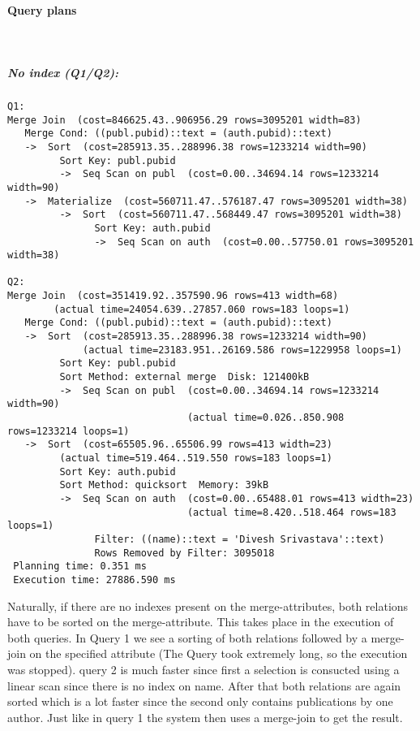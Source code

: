 \documentclass[11pt]{scrartcl}
\begin{document}
\paragraph{Query plans}\mbox{}\\
\subparagraph{No index (Q1/Q2):}
{\small
\begin{verbatim}
Q1:
Merge Join  (cost=846625.43..906956.29 rows=3095201 width=83)
   Merge Cond: ((publ.pubid)::text = (auth.pubid)::text)
   ->  Sort  (cost=285913.35..288996.38 rows=1233214 width=90)
         Sort Key: publ.pubid
         ->  Seq Scan on publ  (cost=0.00..34694.14 rows=1233214 width=90)
   ->  Materialize  (cost=560711.47..576187.47 rows=3095201 width=38)
         ->  Sort  (cost=560711.47..568449.47 rows=3095201 width=38)
               Sort Key: auth.pubid
               ->  Seq Scan on auth  (cost=0.00..57750.01 rows=3095201 width=38)

Q2:
Merge Join  (cost=351419.92..357590.96 rows=413 width=68)
	    (actual time=24054.639..27857.060 rows=183 loops=1)
   Merge Cond: ((publ.pubid)::text = (auth.pubid)::text)
   ->  Sort  (cost=285913.35..288996.38 rows=1233214 width=90)
             (actual time=23183.951..26169.586 rows=1229958 loops=1)
         Sort Key: publ.pubid
         Sort Method: external merge  Disk: 121400kB
         ->  Seq Scan on publ  (cost=0.00..34694.14 rows=1233214 width=90)
                               (actual time=0.026..850.908 rows=1233214 loops=1)
   ->  Sort  (cost=65505.96..65506.99 rows=413 width=23)
	     (actual time=519.464..519.550 rows=183 loops=1)
         Sort Key: auth.pubid
         Sort Method: quicksort  Memory: 39kB
         ->  Seq Scan on auth  (cost=0.00..65488.01 rows=413 width=23)
                               (actual time=8.420..518.464 rows=183 loops=1)
               Filter: ((name)::text = 'Divesh Srivastava'::text)
               Rows Removed by Filter: 3095018
 Planning time: 0.351 ms
 Execution time: 27886.590 ms
\end{verbatim}
Naturally, if there are no indexes present on the merge-attributes, both relations have to be sorted on the merge-attribute. This takes place in the execution of both queries.
In Query 1 we see a sorting of both relations followed by a merge-join on the specified attribute (The Query took extremely long, so the execution was stopped).
query 2 is much faster since first a selection is consucted using a linear scan since there is no index on name. After that both relations are again sorted which is a lot faster
since the second only contains publications by one author. Just like in query 1 the system then uses a merge-join to get the result.
}
\end{document}
